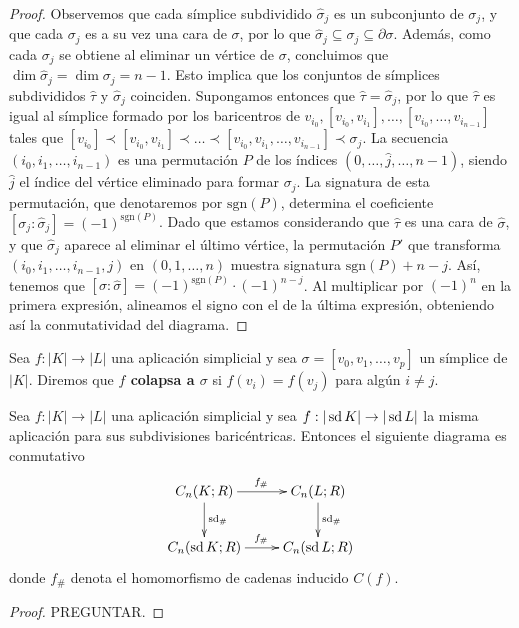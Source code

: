 \begin{proof}
	Observemos que cada símplice subdividido $\widehat{\sigma}_j$ es un subconjunto de $\sigma_j$, y que cada $\sigma_j$ es a su vez una cara de $\sigma$, por lo que $\widehat{\sigma}_j \subseteq \sigma_j \subseteq \partial \sigma$. Además, como cada $\sigma_j$ se obtiene al eliminar un vértice de $\sigma$, concluimos que $\dim \widehat{\sigma}_j = \dim \sigma_j = n-1$.
	Esto implica que los conjuntos de símplices subdivididos $\widehat{\tau}$ y $\widehat{\sigma}_j$ coinciden. Supongamos entonces que $\widehat{\tau} = \widehat{\sigma}_j$, por lo que $\widehat{\tau}$ es igual al símplice formado por los baricentros de $v_{i_0}, [v_{i_0}, v_{i_1}],\ldots, [v_{i_0}, \ldots, v_{i_{n-1}}]$ tales que $[v_{i_0}] \prec [v_{i_0}, v_{i_1}] \prec \ldots \prec [v_{i_0}, v_{i_1}, \ldots, v_{i_{n-1}}] \prec \sigma_j$.
	La secuencia $(i_0, i_1, \ldots, i_{n-1})$ es una permutación $P$ de los índices $(0, \ldots, \widehat{j}, \ldots, n-1)$, siendo $\widehat{j}$ el índice del vértice eliminado para formar $\sigma_j$. La signatura de esta permutación, que denotaremos por $\text{sgn}(P)$, determina el coeficiente $[\sigma_j : \widehat{\sigma}_j] = (-1)^{\text{sgn}(P)}$.
	Dado que estamos considerando que $\widehat{\tau}$ es una cara de $\widehat{\sigma}$, y que $\widehat{\sigma}_j$ aparece al eliminar el último vértice, la permutación $P'$ que transforma $(i_0, i_1, \ldots, i_{n-1}, j)$ en $(0, 1, \ldots, n)$ muestra signatura $\text{sgn}(P) + n - j$. Así, tenemos que $[\sigma : \widehat{\sigma}] = (-1)^{\text{sgn}(P)} \cdot (-1)^{n - j}$. Al multiplicar por $(-1)^n$ en la primera expresión, alineamos el signo con el de la última expresión, obteniendo así la conmutatividad del diagrama.
\end{proof}

\begin{definicion}
	Sea $f : |K| \to |L|$ una aplicación simplicial y sea $\sigma = [v_0, v_1, \dots, v_p]$ un símplice de $|K|$. Diremos que \textbf{$f$ colapsa a $\sigma$} si $f(v_i) = f(v_j)$ para algún $i \neq j$.
\end{definicion}

\begin{lema}
	\label{lem:subdiv_cadenas}
	Sea $f: |K| \to |L|$ una aplicación simplicial y sea $f: |\operatorname{sd} K| \to |\operatorname{sd} L|$ la misma aplicación para sus subdivisiones baricéntricas. Entonces el siguiente diagrama es conmutativo
	\[
		\xymatrix{
			C_n(K;R) \ar@{->}[d]^{\sd_\#} \ar@{->}[r]^{f_\#} & C_n(L;R) \ar@{->}[d]^{\sd_\#} \\
			C_n(\sd K;R) \ar@{->}[r]^{f_\#} & C_n(\sd L;R)
		}
	\]
	donde $f_\#$ denota el homomorfismo de cadenas inducido $C(f)$.
\end{lema}
\begin{proof}
	PREGUNTAR.
\end{proof}

